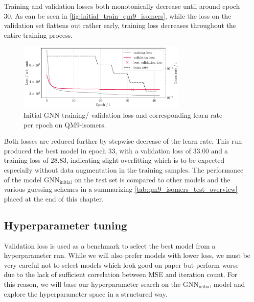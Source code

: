 Training and validation losses both monotonically decrease until around epoch 30. As can be seen in \autoref{fig:initial_train_qm9_isomers}, while the loss on the validation set flattens out rather early, training loss decreases throughout the entire training process. 
\begin{figure}[H]
    \centering
    \includegraphics[width=0.75\textwidth]{../fig/gnn/MGNN_6-31G_NO_AUG_07_07_manual_ref_train_val_loss.pdf}
    \caption[Initial GNN loss on QM9-isomers]{Initial GNN training/ validation loss and corresponding learn rate per epoch on QM9-isomers.}
    \label{fig:initial_train_qm9_isomers}
\end{figure}
Both losses are reduced further by stepwise decrease of the learn rate. This run produced the best model in epoch 33, with a validation loss of $33.00$ and a training loss of $28.83$, indicating slight overfitting which is to be expected especially without data augmentation in the training samples. The performance of the model $\text{GNN}_\text{initial}$ on the test set is compared to other models and the various guessing schemes in a summarizing \autoref{tab:qm9_isomers_test_overview} placed at the end of this chapter. 

\subsection{Hyperparameter tuning}
\label{subsec:qm9_isomers_hyperparamtuning}
Validation loss is used as a benchmark to select the best model from a hyperparameter run. While we will also prefer models with lower loss, we must be very careful not to select models which look good on paper but perform worse due to the lack of sufficient correlation between MSE and iteration count. For this reason, we will base our hyperparameter search on the $\text{GNN}_\text{initial}$ model and explore the hyperparameter space in a structured way. 

